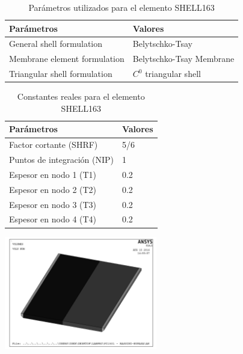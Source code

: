 \begin{table}[h]
\centering
\caption{Parámetros utilizados para el elemento SHELL163}
\label{}
\begin{tabular}{p{6cm} p{6cm}} \hline
Parámetros & Valores \\
\hline
General shell formulation & Belytschko-Tsay \\
Membrane element formulation & Belytschko-Tsay Membrane \\
Triangular shell formulation & $C^0$ triangular shell \\
\hline
\end{tabular}
\label{tab:shell_param}
\end{table}


\begin{table}[h]
\centering
\caption{Constantes reales para el elemento SHELL163}
\label{}
\begin{tabular}{p{6cm} p{3cm}} \hline
Parámetros & Valores \\
\hline
Factor cortante (SHRF) & 5/6 \\
Puntos de integración (NIP) & 1 \\
Espesor en nodo 1 (T1) & 0.2 \\
Espesor en nodo 2 (T2) & 0.2 \\
Espesor en nodo 3 (T3) & 0.2 \\
Espesor en nodo 4 (T4) & 0.2 \\
\hline
\end{tabular}
\label{tab:shell_param}
\end{table}


\begin{center}
\includegraphics[width=0.5\textwidth]{src/ch3/blank_segmentado.pdf}
\label{fig:blank_seg}
\end{center}




